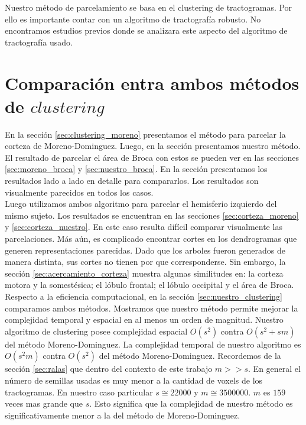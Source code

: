 Nuestro m\'etodo de parcelamiento se basa en el clustering de 
tractogramas. Por ello es importante contar con un algoritmo de 
tractograf\'ia robusto. No encontramos estudios previos donde se analizara
este aspecto del algoritmo de tractograf\'ia usado. \\


\section{Comparaci\'on entra ambos m\'etodos de $clustering$}

En la secci\'on \ref{sec:clustering_moreno} presentamos el m\'etodo para
parcelar la corteza de Moreno-Dominguez. Luego, en la secci\'on
\label{ch:nuestro} presentamos nuestro m\'etodo. El resultado de parcelar
el \'area de Broca con estos se pueden ver en las secciones 
\ref{sec:moreno_broca} y \ref{sec:nuestro_broca}. En la secci\'on 
\label{sec:acercamiento} presentamos los resultados lado a lado en detalle
para compararlos. Los resultados son visualmente parecidos en todos los
casos. \\

Luego utilizamos ambos algoritmo para parcelar el hemisferio izquierdo del
mismo sujeto. Los resultados se encuentran en las secciones 
\ref{sec:corteza_moreno} y \ref{sec:corteza_nuestro}. En este caso 
resulta dif\'icil comparar visualmente las parcelaciones. M\'as a\'un, es
complicado encontrar cortes en los dendrogramas que generen
representaciones parecidas. Dado que los arboles fueron generados
de manera distinta, sus cortes no tienen por que corresponderse. Sin
embargo, la secci\'on \ref{sec:acercamiento_corteza} muestra algunas
similitudes en: la corteza motora y la somest\'esica; el l\'obulo frontal;
el l\'obulo occipital y el \'area de Broca. \\

Respecto a la eficiencia computacional, en la secci\'on 
\ref{sec:nuestro_clustering} comparamos ambos m\'etodos. 
Mostramos que nuestro m\'etodo permite mejorar la complejidad temporal y
espacial en al menos un orden de magnitud. Nuestro algoritmo de clustering
posee complejidad espacial $O(s^2)$ contra $O(s^2 + sm)$ del m\'etodo
Moreno-Dominguez. La complejidad temporal de nuestro algoritmo es $O(s^2m)$
contra $O(s^2)$ del m\'etodo Moreno-Dominguez. Recordemos de la secci\'on
\ref{sec:ralas} que dentro del contexto de este trabajo $m >> s$. En
general el n\'umero de semillas usadas es muy menor a la cantidad de
voxels de los tractogramas. En nuestro caso particular $s \cong 22000$ y
$m \cong 3500000$. $m$ es $159$ veces mas grande que $s$. Esto significa
que la complejidad de nuestro m\'etodo es significativamente menor a la
del m\'etodo de Moreno-Dominguez. \\


